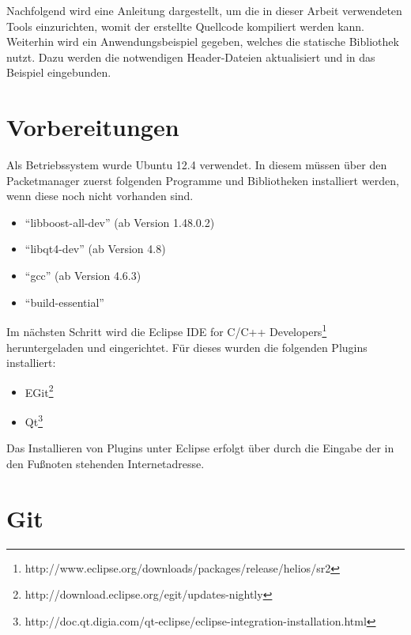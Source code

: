 Nachfolgend wird eine Anleitung dargestellt, um die in
dieser Arbeit verwendeten Tools einzurichten, womit der erstellte
Quellcode kompiliert werden kann. Weiterhin wird ein Anwendungsbeispiel
gegeben, welches die statische Bibliothek nutzt. Dazu werden die notwendigen
Header-Dateien aktualisiert und in das Beispiel eingebunden.

\section{Vorbereitungen}

Als Betriebssystem wurde Ubuntu 12.4 verwendet. In diesem m{\"u}ssen
{\"u}ber den Packetmanager zuerst folgenden Programme und Bibliotheken installiert
werden, wenn diese noch nicht vorhanden sind.

\begin{itemize}
\item "`libboost-all-dev"' (ab Version 1.48.0.2) 
\item "`libqt4-dev"' (ab Version 4.8)
\item "`gcc"' (ab Version 4.6.3)
\item "`build-essential"'
\end{itemize}

Im n{\"a}chsten Schritt wird die Eclipse IDE for C/C++
Developers\footnote{http://www.eclipse.org/downloads/packages/release/helios/sr2}
heruntergeladen und eingerichtet. F{\"u}r dieses wurden die folgenden Plugins installiert:

\begin{itemize}
\item EGit\footnote{http://download.eclipse.org/egit/updates-nightly}
\item
Qt\footnote{http://doc.qt.digia.com/qt-eclipse/eclipse-integration-installation.html}
\end{itemize}

Das Installieren von Plugins unter Eclipse erfolgt {\"u}ber  durch die Eingabe der in den Fu{\ss}noten stehenden
Internetadresse.

\section{Git}


